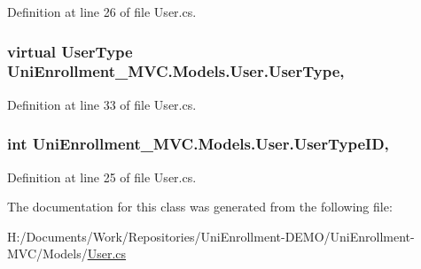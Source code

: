 Definition at line 26 of file User.\+cs.

\subsubsection[{\texorpdfstring{User\+Type}{UserType}}]{\setlength{\rightskip}{0pt plus 5cm}virtual {\bf User\+Type} Uni\+Enrollment\+\_\+\+M\+V\+C.\+Models.\+User.\+User\+Type\hspace{0.3cm}{\ttfamily [get]}, {\ttfamily [set]}}\hypertarget{class_uni_enrollment___m_v_c_1_1_models_1_1_user_ab82d44a89b2d1a28799473bb38e080d0}{}\label{class_uni_enrollment___m_v_c_1_1_models_1_1_user_ab82d44a89b2d1a28799473bb38e080d0}


Definition at line 33 of file User.\+cs.

\subsubsection[{\texorpdfstring{User\+Type\+ID}{UserTypeID}}]{\setlength{\rightskip}{0pt plus 5cm}int Uni\+Enrollment\+\_\+\+M\+V\+C.\+Models.\+User.\+User\+Type\+ID\hspace{0.3cm}{\ttfamily [get]}, {\ttfamily [set]}}\hypertarget{class_uni_enrollment___m_v_c_1_1_models_1_1_user_a4f4c507ff2264229f9e1a0d319134a33}{}\label{class_uni_enrollment___m_v_c_1_1_models_1_1_user_a4f4c507ff2264229f9e1a0d319134a33}


Definition at line 25 of file User.\+cs.



The documentation for this class was generated from the following file\+:\begin{DoxyCompactItemize}
\item 
H\+:/\+Documents/\+Work/\+Repositories/\+Uni\+Enrollment-\/\+D\+E\+M\+O/\+Uni\+Enrollment-\/\+M\+V\+C/\+Models/\hyperlink{_user_8cs}{User.\+cs}\end{DoxyCompactItemize}
